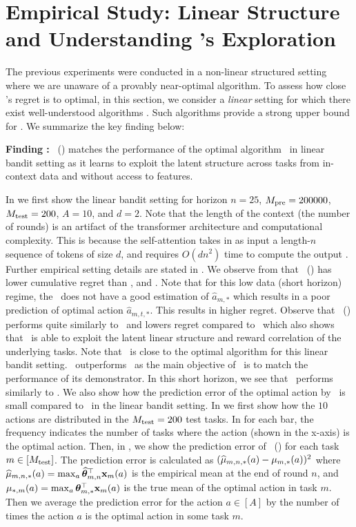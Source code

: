 \documentclass[10pt]{article}
\theoremstyle{plain}
\theoremstyle{definition}
\theoremstyle{remark}
\newcounter{findingcounter}
\newcommand{\customfinding}[1][\normalfont]{\stepcounter{findingcounter}\textbf{Finding \thefindingcounter:}#1 }
\begin{document}
\section{Empirical Study: Linear Structure and Understanding \pred's Exploration}
\label{sec:linear}
\vspace*{-0.5em}
The previous experiments were conducted in a non-linear structured setting where we are unaware of a provably near-optimal algorithm.
To assess how close \pred's regret is to optimal, in this section, we consider a \textit{linear} setting for which there exist well-understood algorithms \citep{abbasi2011improved,lattimore2020bandit}.
Such algorithms provide a strong upper bound for \pred. We summarize the key finding below:
\begin{tcolorbox}
\customfinding \pred\ (\gt) matches the performance of the optimal algorithm \linucb\ in linear bandit setting as it learns to exploit the latent structure across tasks from in-context data and without access to features.
\end{tcolorbox}
In  we first show the linear bandit setting for horizon $n=25$, $M_{\text{pre}} = 200000$, $M_{\text{test}} = 200$, $A=10$, and $d=2$.
Note that the length of the context (the number of rounds) is an artifact of the transformer architecture and computational complexity. This is because the self-attention takes in as input a length-$n$ sequence of tokens of size $d$, and requires $O\left(d n^2\right)$ time to compute the output \citep{keles2023computational}.
Further empirical setting details are stated in .
We observe from   that \pred\ (\gt) has lower cumulative regret than \dptg, and \ad. Note that for this low data (short horizon) regime, the \dptg\ does not have a good estimation of $\widehat{a}_{m,*}$ which results in a poor prediction of optimal action $\widehat{a}_{m,t,*}$. This results in higher regret. Observe that \pred\ (\gt) performs quite similarly to \linucb\ and lowers regret compared to \ts\ which also shows that \pred\ is able to exploit the latent linear structure and reward correlation of the underlying tasks.
Note that \linucb\ is close to the optimal algorithm for this linear bandit setting.
\pred\ outperforms \ad\ as the main objective of \ad\ is to match the performance of its demonstrator.
In this short horizon, we see that \mlin\ performs similarly to \linucb.
We also show how the prediction error of the optimal action by \pred\ is small compared to \linucb\ in the linear bandit setting. In  we first show how the $10$ actions are distributed in the $M_{\text{test}}=200$ test tasks. In  for each bar, the frequency indicates the number of tasks where the action (shown in the x-axis) is the optimal action. Then, in , we show the prediction error of \pred\ (\gt) for each task $m\in[M_{\text{test}}]$. The prediction error is calculated as $(\widehat{\mu}_{m,n, *}(a) - \mu_{m, *}(a))^2$ where $\widehat{\mu}_{m,n, *}(a) = \max_a\widehat{\boldsymbol{\theta}}_{m,n}^\top\mathbf{x}_m(a)$ is the empirical mean at the end of round $n$, and $\mu_{*,m}(a)=\max_a\boldsymbol{\theta}_{m,*}^\top\mathbf{x}_m(a)$ is the true mean of the optimal action in task $m$. Then we average the prediction error for the action $a\in [A]$ by the number of times the action $a$ is the optimal action in some task $m$.
\end{document}
